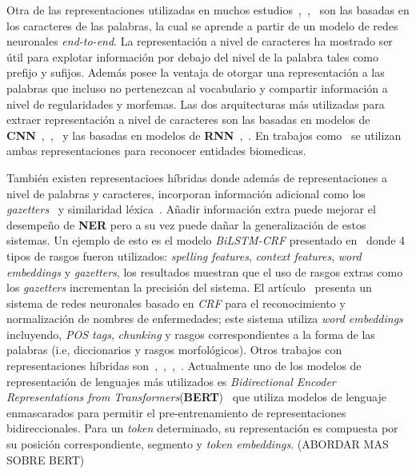 Otra de las representaciones utilizadas en muchos estudios~\cite{kuru2016charner},~\cite{tran2017named},~\cite{li2018segbot} son las basadas en los caracteres de las palabras, la cual se aprende a partir de un modelo de redes neuronales \emph{end-to-end}. La representaci\'on a nivel de caracteres ha mostrado ser \'util para explotar informaci\'on por debajo del nivel de la palabra tales como prefijo y sufijos. Adem\'as posee la ventaja de otorgar una representaci\'on a las palabras que incluso no pertenezcan al vocabulario y compartir informaci\'on a nivel de regularidades y morfemas. Las dos arquitecturas m\'as utilizadas para extraer representaci\'on a nivel de caracteres son las basadas en modelos de \textbf{CNN}~\cite{ma2016end},~\cite{li2017leveraging},~\cite{yang2017neural} y las basadas en modelos de \textbf{RNN}~\cite{lample2016neural},~\cite{kuru2016charner}. En trabajos como~\cite{gridach2017character} se utilizan ambas representaciones para reconocer entidades biomedicas.

Tambi\'en existen representacioes h\'ibridas donde adem\'as de representaciones a nivel de palabras y caracteres, incorporan informaci\'on adicional como los \emph{gazetters}~\cite{huang2015bidirectional} y similaridad l\'exica~\cite{ghaddar2018robust}. A\~nadir informaci\'on extra puede mejorar el desempe\~no de \textbf{NER} pero a su vez puede da\~nar la generalizaci\'on de estos sistemas. Un ejemplo de esto es el modelo \emph{BiLSTM-CRF} presentado en~\cite{huang2015bidirectional} donde 4 tipos de rasgos fueron utilizados: \emph{spelling features}, \emph{context features}, \emph{word embeddings} y \emph{gazetters}, los resultados muestran que el uso de rasgos extras como los \emph{gazetters} incrementan la precisi\'on del sistema. El art\'iculo~\cite{wei2016disease} presenta un sistema de redes neuronales basado en \emph{CRF} para el reconocimiento y normalizaci\'on de nombres de enfermedades; este sistema utiliza \emph{word embeddings} incluyendo, \emph{POS tags}, \emph{chunking} y rasgos correspondientes a la forma de las palabras (i.e, diccionarios y rasgos morfol\'ogicos). Otros trabajos con representaciones h\'ibridas son~\cite{lin2017multi},~\cite{aguilar2019multi},~\cite{jansson2017distributed},~\cite{moon2018multimodal}. Actualmente uno de los modelos de representaci\'on de lenguajes m\'as utilizados es \emph{Bidirectional Encoder Representations from Transformers}(\textbf{BERT})~\cite{devlin2018bert} que utiliza modelos de lenguaje enmascarados para permitir el pre-entrenamiento de representaciones bidireccionales. Para un \emph{token} determinado, su representaci\'on es compuesta por su posici\'on correspondiente, segmento y \emph{token embeddings}. (ABORDAR MAS SOBRE BERT)


